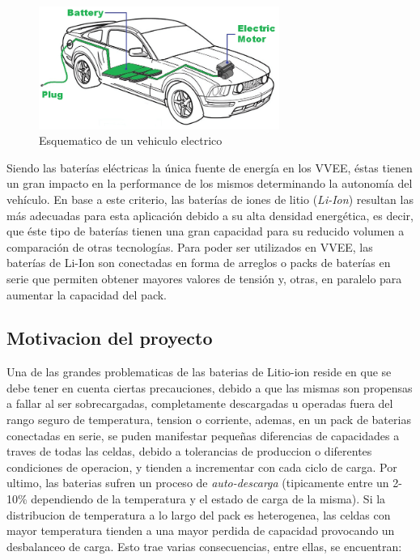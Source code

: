 \documentclass[10pt,a4paper]{article}
\begin{document}
    \begin{figure}[h!]
        \begin{center}
            \includegraphics[width=0.7\textwidth]{EV.png}
            \caption{Esquematico de un vehiculo electrico}
            \label{EV}
        \end{center}
    \end{figure}


	\noindent Siendo las baterías eléctricas la única fuente de energía en los 
    VVEE, éstas tienen un gran impacto en la performance de los mismos 
    determinando la autonomía del vehículo. En base a este criterio, las 
    baterías de iones de litio (\emph{Li-Ion}) resultan las más adecuadas para 
    esta aplicación debido a su alta densidad energética, es decir, que éste 
    tipo de baterías tienen una gran capacidad para su reducido volumen a 
    comparación de otras tecnologías. Para poder ser utilizados en VVEE, las 
    baterías de Li-Ion son conectadas en forma de arreglos o packs de baterías 
    en serie que permiten obtener mayores valores de tensión y, otras, en 
    paralelo para aumentar la capacidad del pack. 

    \subsection{Motivacion del proyecto}
	
	\noindent Una de las grandes problematicas de las baterias de Litio-ion 
    reside en que se debe tener en cuenta ciertas precauciones,
    debido a que las mismas son propensas a fallar al ser sobrecargadas, 
    completamente descargadas u operadas fuera del
    rango seguro de temperatura, tension o corriente, ademas, en un pack de 
    baterias conectadas en serie, se puden manifestar pequeñas diferencias de 
    capacidades a traves de todas las celdas, debido a tolerancias de
    produccion o diferentes condiciones de operacion, y tienden
    a incrementar con cada ciclo de carga. Por ultimo, las baterias
    sufren un proceso de \emph{auto-descarga} (tipicamente entre un
    2-10\% dependiendo de la temperatura y el estado de carga de la misma). 
    Si la distribucion de temperatura a lo largo del pack es
    heterogenea, las celdas con mayor temperatura tienden a una mayor
    perdida de capacidad provocando un desbalanceo de carga.
    Esto trae varias consecuencias, entre ellas, se encuentran:
\end{document}
